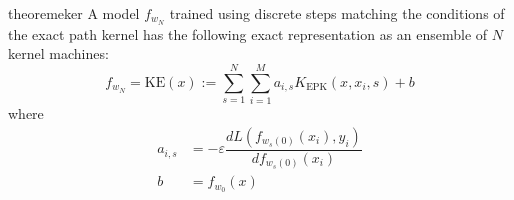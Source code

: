 \begin{restatable}{theorem}{eker}
\label{thm:eker}
A model $f_{w_N}$ trained using discrete steps matching the conditions of the exact path kernel has the following exact representation as an ensemble of $N$ kernel machines:
\begin{equation}
f_{w_N} = \text{KE}(x) :=  \sum_{s = 1}^N \sum_{i = 1}^{M} a_{i,s} K_{\text{EPK}}(x, x_i, s) + b
\label{ensemble}
\end{equation}
where
\begin{align}
a_{i, s} &= -\varepsilon  \dfrac{d L(f_{w_s(0)}(x_i),  y_i)}{d f_{w_s(0)}(x_i)} \\
b &= f_{w_0}(x)
\end{align}
\end{restatable}

